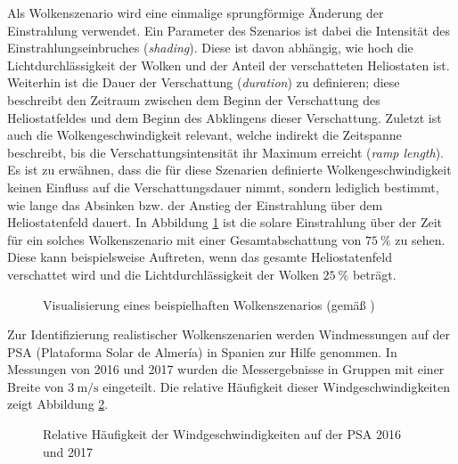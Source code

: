 Als Wolkenszenario wird eine einmalige sprungförmige Änderung der Einstrahlung verwendet.
Ein Parameter des Szenarios ist dabei die Intensität des Einstrahlungseinbruches (\textit{shading}).
Diese ist davon abhängig, wie hoch die Lichtdurchlässigkeit der Wolken und der Anteil der verschatteten Heliostaten ist.
Weiterhin ist die Dauer der Verschattung (\textit{duration}) zu definieren; diese beschreibt den Zeitraum zwischen dem Beginn der Verschattung des Heliostatfeldes und dem Beginn des Abklingens dieser Verschattung.
Zuletzt ist auch die Wolkengeschwindigkeit relevant, welche indirekt die Zeitspanne beschreibt, bis die Verschattungsintensität ihr Maximum erreicht (\textit{ramp length}).
Es ist zu erwähnen, dass die für diese Szenarien definierte Wolkengeschwindigkeit keinen Einfluss auf die Verschattungsdauer nimmt, sondern lediglich bestimmt, wie lange das Absinken bzw. der Anstieg der Einstrahlung über dem Heliostatenfeld dauert.
In Abbildung \ref{fig_TestszenarioWolken} ist die solare Einstrahlung über der Zeit für ein solches Wolkenszenario mit einer Gesamtabschattung von $\SI{75}{\percent}$ zu sehen.
Diese kann beispielsweise Auftreten, wenn das gesamte Heliostatenfeld verschattet wird und die Lichtdurchlässigkeit der Wolken $\SI{25}{\percent}$ beträgt.

\begin{figure}[h!]
    \centering
    \setlength{\fboxsep}{1pt}
    \setlength{\fboxrule}{1pt}
    \caption[Visualisierung eines beispielhaften Wolkenszenarios]{Visualisierung eines beispielhaften Wolkenszenarios (gemäß \cite[S.62]{DissHirsch})}
    \label{fig_TestszenarioWolken}
\end{figure} \pagebreak

Zur Identifizierung realistischer Wolkenszenarien werden Windmessungen auf der PSA (Plataforma Solar de Almería) in Spanien zur Hilfe genommen.
In Messungen von 2016 und 2017 wurden die Messergebnisse in Gruppen mit einer Breite von $\SI{3}{\metre\per\second}$ eingeteilt.
Die relative Häufigkeit dieser Windgeschwindigkeiten zeigt Abbildung \ref{fig_Windklassen}.

\begin{figure}[h!]
    \centering
    \setlength{\fboxsep}{1pt}
    \setlength{\fboxrule}{1pt}
    \caption[Relative Häufigkeit der Windgeschwindigkeiten auf der PSA 2016 und 2017]{Relative Häufigkeit der Windgeschwindigkeiten auf der PSA 2016 und 2017}
    \label{fig_Windklassen}
\end{figure}

